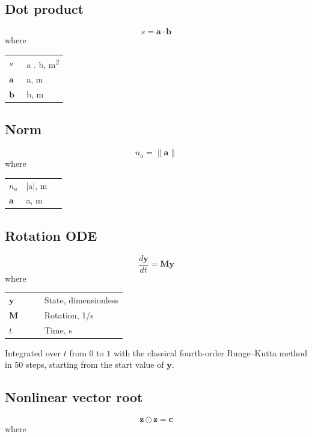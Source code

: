 \documentclass[11pt,a4paper]{article}
\begin{document}
\subsection{Dot product}
\begin{equation}
  s = \mathbf{a} \cdot \mathbf{b}
  \label{eq:dot-product}
\end{equation}
\noindent where

\noindent\begin{tabular}{@{\quad}l@{\quad}p{0.7\linewidth}@{}}
  $s$ & a . b, \si{m^{2}} \\
  $\mathbf{a}$ & a, \si{m} \\
  $\mathbf{b}$ & b, \si{m} \\
\end{tabular}


\subsection{Norm}
\begin{equation}
  n_a = \|\mathbf{a}\|
  \label{eq:norm}
\end{equation}
\noindent where

\noindent\begin{tabular}{@{\quad}l@{\quad}p{0.7\linewidth}@{}}
  $n_a$ & |a|, \si{m} \\
  $\mathbf{a}$ & a, \si{m} \\
\end{tabular}


\subsection{Rotation ODE}
\begin{equation}
  \frac{d\mathbf{y}}{dt} = \mathbf{M}\mathbf{y}
  \label{eq:rotation-ode}
\end{equation}
\noindent where

\noindent\begin{tabular}{@{\quad}l@{\quad}p{0.7\linewidth}@{}}
  $\mathbf{y}$ & State, dimensionless \\
  $\mathbf{M}$ & Rotation, \si{1/s} \\
  $t$ & Time, \si{s} \\
\end{tabular}

\noindent Integrated over $t$ from $0$ to $1$ with the classical fourth-order Runge–Kutta method in 50 steps, starting from the start value of $\mathbf{y}$.

\subsection{Nonlinear vector root}
\begin{equation}
  \mathbf{z} \odot \mathbf{z} = \mathbf{c}
  \label{eq:nonlinear-vector-root}
\end{equation}
\noindent where
\end{document}
